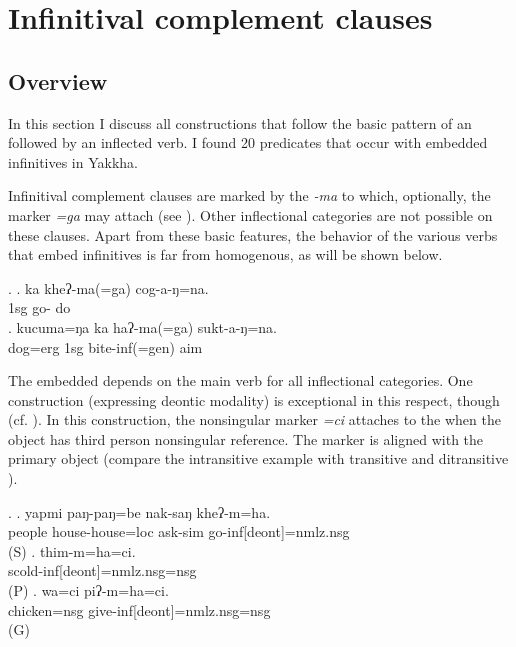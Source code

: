 \section{Infinitival complement clauses}\label{nonfin-comp}
\subsection{Overview}

In this section I discuss all constructions that follow the basic pattern of an  followed by an inflected verb. I found 20 predicates  that occur with embedded infinitives in Yakkha. 

Infinitival complement clauses are marked by the  \emph{-ma} to which, optionally, the  marker \emph{=ga}  may attach (see \Next). Other inflectional categories are not possible on these clauses. Apart from these basic features, the behavior of the various verbs that  embed infinitives is far from homogenous, as will be shown below. 

 \ex. \ag. ka kheʔ-ma(=ga) cog-a-ŋ=na.\\
		{\sc 1sg}  go- do\\
		\bg. kucuma=ŋa ka haʔ-ma(=ga) sukt-a-ŋ=na.\\
		dog{\sc =erg} {\sc 1sg} bite{\sc -inf(=gen)} aim\\
	
	
The embedded  depends on the main verb for all inflectional categories. One construction (expressing deontic modality) is exceptional in this respect, though (cf. ). In this construction, the nonsingular marker \emph{=ci}  attaches to the  when the object has third person nonsingular reference. The marker is aligned with the primary object (compare the intransitive example \Next[a] with transitive  \Next[b] and ditransitive \Next[c]).  
			
\ex. \ag. yapmi  paŋ-paŋ=be nak-saŋ kheʔ-m=ha.\\
		people house-house{\sc =loc} ask-{\sc sim} go-{\sc inf[deont]=nmlz.nsg}\\
	  (S) 
\bg. thim-m=ha=ci.\\
scold-{\sc inf[deont]=nmlz.nsg=nsg}\\
 (P)
 \bg. wa=ci piʔ-m=ha=ci.\\
chicken{\sc =nsg} give-{\sc inf[deont]=nmlz.nsg=nsg}\\
 (G)



